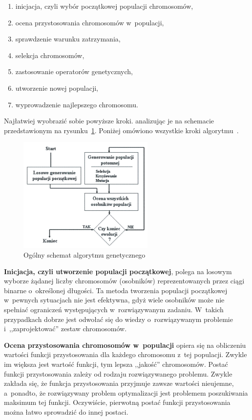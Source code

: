 \documentclass[twoside,12pt]{report}
\begin{document}
\begin{enumerate}
\item inicjacja, czyli wybór początkowej populacji chromosomów,
\item ocena przystosowania chromosomów w~populacji,
\item sprawdzenie warunku zatrzymania,
\item selekcja chromosomów,
\item zastosowanie operatorów genetycznych,
\item utworzenie nowej populacji,
\item wyprowadzenie najlepszego chromosomu.
\end{enumerate}

Najłatwiej wyobrazić sobie powyższe kroki. analizując je na schemacie przedstawionym na rysunku~\ref{fig:ogolny_schemat_alg_genetycznego}. Poniżej omówiono wszystkie kroki algorytmu~\cite{gene}.

\begin{figure}[htbp]
	\centering
	\includegraphics[width=0.6\textwidth]{img/ogolgene}
	\caption{Ogólny schemat algorytmu genetycznego}
	\label{fig:ogolny_schemat_alg_genetycznego}
\end{figure}

\textbf{Inicjacja, czyli utworzenie populacji początkowej}, polega na losowym wyborze żądanej liczby chromosomów (osobników) reprezentowanych przez ciągi binarne o~określonej długości. Ta metoda tworzenia populacji początkowej w~pewnych sytuacjach nie jest efektywna, gdyż wiele osobników może nie spełniać ograniczeń występujących w~rozwiązywanym zadaniu. W~takich przypadkach dobrze jest odwołać się do wiedzy o~rozwiązywanym problemie i~,,zaprojektować'' zestaw chromosomów.

\textbf{Ocena przystosowania chromosomów w~populacji} opiera się na obliczeniu wartości funkcji przystosowania dla każdego chromosomu z~tej populacji. Zwykle im większa jest wartość funkcji, tym lepsza ,,jakość'' chromosomów. Postać funkcji przystosowania zależy od rodzaju rozwiązywanego problemu. Zwykle zakłada się, że funkcja przystosowania przyjmuje zawsze wartości nieujemne, a~ponadto, że rozwiązywany problem optymalizacji jest problemem poszukiwania maksimum tej funkcji. Oczywiście, pierwotną postać funkcji przystosowania można łatwo sprowadzić do innej postaci.
\end{document}
